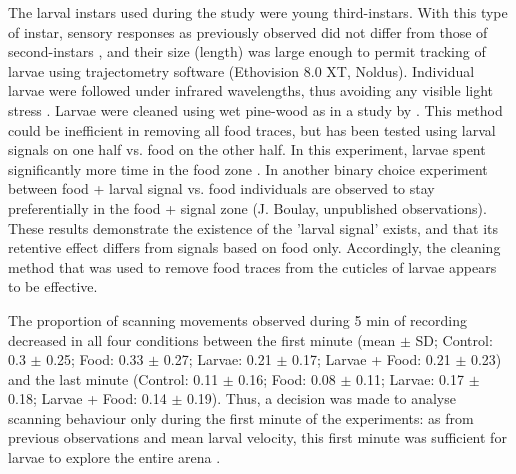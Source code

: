 The larval instars used during the study were young third-instars. With this type of instar, sensory responses as previously observed did not differ from those of second-instars \cite{cobb_what_1999}, and their size (length) was large enough to permit tracking of larvae using trajectometry software (Ethovision 8.0 XT, Noldus). Individual larvae were followed under infrared wavelengths, thus avoiding any visible light stress \cite{hinnemann_see_2010}. Larvae were cleaned using wet pine-wood as in a study by \citet{boulay_evidence_2013}. This method could be inefficient in removing all food traces, but has been tested using larval signals on one half vs. food on the other half. In this experiment, larvae spent significantly more time in the food zone \cite{boulay_evidence_2013}. In another binary choice experiment between food + larval signal vs. food individuals are observed to stay preferentially in the food + signal zone (J. Boulay, unpublished observations). These results demonstrate the existence of the 'larval signal' exists, and that its retentive effect differs from signals based on food only. Accordingly, the cleaning method that was used to remove food traces from the cuticles of larvae appears to be effective.

The proportion of scanning movements observed during 5 min of recording decreased in all four conditions between the first minute (mean $\pm$ SD; Control: 0.3 $\pm$ 0.25; Food: 0.33 $\pm$ 0.27; Larvae: 0.21 $\pm$ 0.17; Larvae + Food: 0.21 $\pm$ 0.23) and the last minute (Control: 0.11 $\pm$ 0.16; Food: 0.08 $\pm$ 0.11; Larvae: 0.17 $\pm$ 0.18; Larvae + Food: 0.14 $\pm$ 0.19). Thus, a decision was made to analyse scanning behaviour only during the first minute of the experiments: as from previous observations and mean larval velocity, this first minute was sufficient for larvae to explore the entire arena \citep{charabidze_effect_2008, boulay_evidence_2013}.

